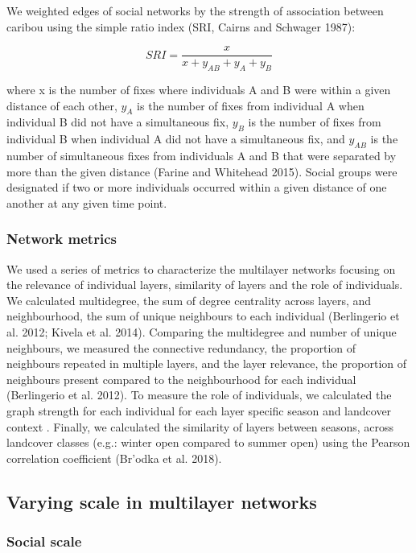 \documentclass[]{article}
\begin{document}
We weighted edges of social networks by the strength of association between
caribou using the simple ratio index (SRI, Cairns and Schwager 1987):

\[ SRI = \frac{x}{x + y_{AB} + y_{A} + y_{B}} \]

where x is the number of fixes where individuals A and B were within a given
distance of each other, \(y_{A}\) is the number of fixes from individual A when
individual B did not have a simultaneous fix, \(y_{B}\) is the number of fixes
from individual B when individual A did not have a simultaneous fix, and
\(y_{AB}\) is the number of simultaneous fixes from individuals A and B that were
separated by more than the given distance (Farine and Whitehead 2015). Social groups were
designated if two or more individuals occurred within a given distance of one
another at any given time point.

\hypertarget{network-metrics}{%
\subsubsection{Network metrics}\label{network-metrics}}

We used a series of metrics to characterize the multilayer networks focusing on
the relevance of individual layers, similarity of layers and the role of
individuals. We calculated multidegree, the sum of degree centrality across
layers, and neighbourhood, the sum of unique neighbours to each individual
(Berlingerio et al. 2012; Kivela et al. 2014). Comparing the multidegree and number of
unique neighbours, we measured the connective redundancy, the proportion of
neighbours repeated in multiple layers, and the layer relevance, the proportion
of neighbours present compared to the neighbourhood for each individual
(Berlingerio et al. 2012). To measure the role of individuals, we calculated the graph
strength for each individual for each layer specific season and landcover
context . Finally, we calculated the similarity of layers
between seasons, across landcover classes (e.g.: winter open compared to summer
open) using the Pearson correlation coefficient (Br\a'odka et al. 2018).

\hypertarget{varying-scale-in-multilayer-networks}{%
\subsection{Varying scale in multilayer networks}\label{varying-scale-in-multilayer-networks}}

\hypertarget{social-scale}{%
\subsubsection{Social scale}\label{social-scale}}
\end{document}
